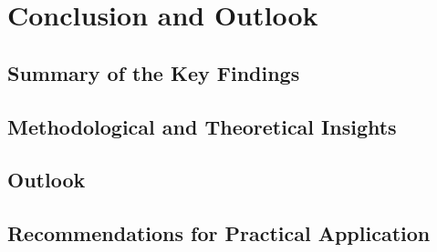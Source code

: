 \chapter{Conclusion and Outlook}
\label{chap:conclusion}

\section{Summary of the Key Findings}

\section{Methodological and Theoretical Insights}

\section{Outlook}

\section{Recommendations for Practical Application}
